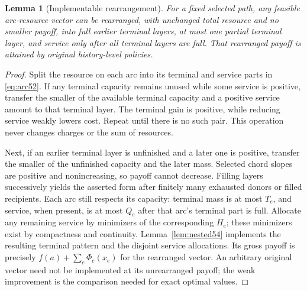 \documentclass[11pt,letterpaper]{article}
\newtheorem{lemma}[theorem]{Lemma}
\theoremstyle{definition}\newtheorem{remark}[theorem]{Remark}
\begin{document}
\begin{lemma}[Implementable rearrangement]\label{lem:rearrange54}
For a fixed selected path, any feasible arc-resource vector can be rearranged, with unchanged total resource and no smaller payoff, into full earlier terminal layers, at most one partial terminal layer, and service only after all terminal layers are full. That rearranged payoff is attained by original history-level policies.
\end{lemma}
\begin{proof}
Split the resource on each arc into its terminal and service parts in \eqref{eq:arc52}. If any terminal capacity remains unused while some service is positive, transfer the smaller of the available terminal capacity and a positive service amount to that terminal layer. The terminal gain is positive, while reducing service weakly lowers cost. Repeat until there is no such pair. This operation never changes charges or the sum of resources.

Next, if an earlier terminal layer is unfinished and a later one is positive, transfer the smaller of the unfinished capacity and the later mass. Selected chord slopes are positive and nonincreasing, so payoff cannot decrease. Filling layers successively yields the asserted form after finitely many exhausted donors or filled recipients. Each arc still respects its capacity: terminal mass is at most $T_e$, and service, when present, is at most $Q_e$ after that arc's terminal part is full. Allocate any remaining service by minimizers of the corresponding $H_e$; these minimizers exist by compactness and continuity. Lemma~\ref{lem:nested54} implements the resulting terminal pattern and the disjoint service allocations. Its gross payoff is precisely $f(a)+\sum_e\Phi_e(x_e)$ for the rearranged vector. An arbitrary original vector need not be implemented at its unrearranged payoff; the weak improvement is the comparison needed for exact optimal values.
\end{proof}
\end{document}
